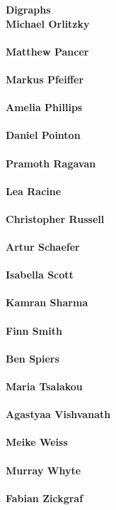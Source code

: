 \documentclass[a4paper,11pt]{report}
\newcommand{\maintitlesize}{\fontsize{50}{55}\selectfont}
\begin{document}
\begin{titlepage}
\begin{center}{\maintitlesize \textbf{ Digraphs \mbox{}}}
{{  \mbox{}}}\\
{\Large \textbf{ Michael Orlitzky\\
   \mbox{}}}\\
{\Large \textbf{ Matthew Pancer\\
  \mbox{}}}\\
{\Large \textbf{ Markus Pfeiffer\\
   \mbox{}}}\\
{\Large \textbf{ Amelia Phillips\\
  \mbox{}}}\\
{\Large \textbf{ Daniel Pointon\\
  \mbox{}}}\\
{\Large \textbf{ Pramoth Ragavan\\
  \mbox{}}}\\
{\Large \textbf{ Lea Racine\\
  \mbox{}}}\\
{\Large \textbf{ Christopher Russell\\
 \mbox{}}}\\
{\Large \textbf{ Artur Schaefer\\
  \mbox{}}}\\
{\Large \textbf{ Isabella Scott\\
  \mbox{}}}\\
{\Large \textbf{ Kamran Sharma\\
  \mbox{}}}\\
{\Large \textbf{ Finn Smith\\
   \mbox{}}}\\
{\Large \textbf{ Ben Spiers\\
  \mbox{}}}\\
{\Large \textbf{ Maria Tsalakou\\
   \mbox{}}}\\
{\Large \textbf{ Agastyaa Vishvanath\\
  \mbox{}}}\\
{\Large \textbf{ Meike Weiss\\
    \mbox{}}}\\
{\Large \textbf{ Murray Whyte\\
   \mbox{}}}\\
{\Large \textbf{ Fabian Zickgraf\\
  \mbox{}}}\\
\hypersetup{pdfauthor= Jan De Beule\\
    ;  Julius Jonusas\\
   ;  James Mitchell\\
    ;  Wilf A. Wilson\\
}
\end{center}
\end{titlepage}
\end{document}

